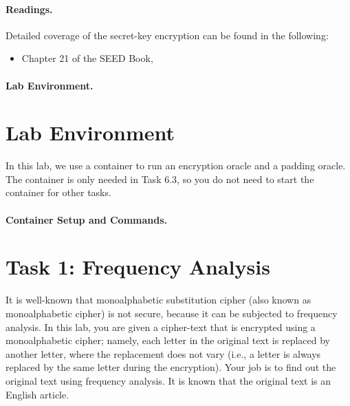 \paragraph{Readings.}
Detailed coverage of the secret-key encryption can be found in the following:

\begin{itemize}
\item Chapter 21 of the SEED Book, \seedbook
\end{itemize}


\paragraph{Lab Environment.} \seedenvironmentB


\section{Lab Environment}

In this lab, we use a container to run an encryption oracle
and a padding oracle. The container is only needed in Task 
6.3, so you do not need to start the container for other tasks. 


\paragraph{Container Setup and Commands.}




\section{Task 1: Frequency Analysis}

It is well-known that monoalphabetic substitution cipher (also known as monoalphabetic cipher)
is not secure, because it can be subjected to frequency analysis. In this lab, you are given
a cipher-text that is encrypted using a monoalphabetic cipher; namely,
each letter in the original text is replaced by another letter,
where the replacement does not vary (i.e., a letter is always replaced by the same letter
during the encryption). Your job is to find out the original text using
frequency analysis. It is known that the original text is an English article.


